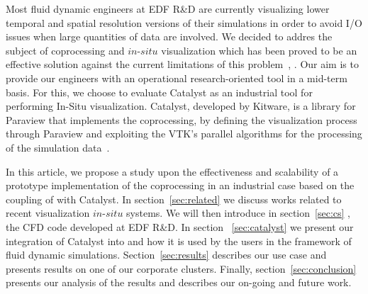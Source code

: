 Most fluid dynamic engineers at EDF R\&D are currently visualizing lower temporal and spatial 
resolution versions of their simulations in order to avoid I/O issues when large quantities of data are involved.
We decided to addres the subject of coprocessing and $in$-$situ$
visualization which has been proved to be an effective solution against the current
limitations of this problem~\cite{sandiareport}, \cite{4090186}. Our aim is to provide 
our engineers with an operational research-oriented tool in a mid-term basis.
For this, we choose to evaluate Catalyst as an industrial tool for performing In-Situ visualization. 
Catalyst, developed by Kitware, is a library for Paraview that implements the
coprocessing, by defining the visualization process through Paraview and
exploiting the VTK's parallel algorithms for the processing of the simulation
data~\cite{6092322}. 

In this article, we propose a study upon the effectiveness and scalability of a
prototype implementation of the coprocessing in an industrial case based on the
coupling of \CS with Catalyst. In section~\ref{sec:related} we
discuss works related to recent visualization $in$-$situ$ systems. We will then
introduce in section~\ref{sec:cs} \CS, the CFD code developed at EDF
R\&D. In section ~\ref{sec:catalyst} we present our integration of Catalyst into
\CS and how it is used by the users in the framework of fluid dynamic
simulations. Section~\ref{sec:results} describes our use case and presents
results on one of our corporate clusters. Finally, section~\ref{sec:conclusion} 
presents our analysis of the results and describes our on-going and future work.

